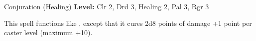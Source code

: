 {Conjuration (Healing)}
{
	\textbf{Level:}
	Clr 2, Drd 3, Healing 2, Pal 3, Rgr 3\\
}
{
	This spell functions like , except that it cures 2d8 points of damage +1 point per caster level (maximum +10).

}
